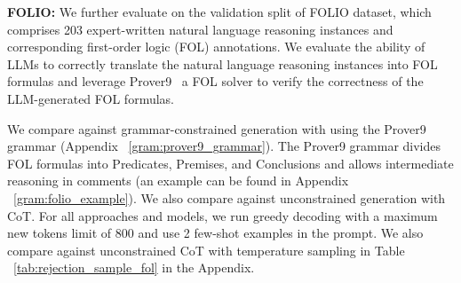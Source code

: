 




\textbf{FOLIO: }We further evaluate \Tool{} on the validation split of FOLIO dataset, which comprises 203 expert-written natural language reasoning instances and corresponding first-order logic (FOL) annotations. 
We evaluate the ability of LLMs to correctly translate the natural language reasoning instances into FOL formulas and leverage Prover9~\cite{prover9-mace4} a FOL solver to verify the correctness of the LLM-generated FOL formulas. 

We compare \Tool{} against grammar-constrained generation with \syncode{} using the Prover9 grammar (Appendix ~\ref{gram:prover9_grammar}). 
The Prover9 grammar divides FOL formulas into Predicates, Premises, and Conclusions and allows intermediate reasoning in comments (an example can be found in Appendix ~\ref{gram:folio_example}). 
We also compare \Tool{} against unconstrained generation with CoT. 
For all approaches and models, we run greedy decoding with a maximum new tokens limit of 800 and use 2 few-shot examples in the prompt. We also compare \Tool{} against unconstrained CoT with temperature sampling in Table ~\ref{tab:rejection_sample_fol} in the Appendix. 

